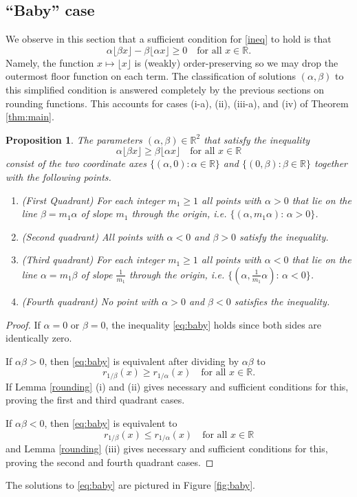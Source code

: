 \documentclass[12pt,letterpaper, reqno]{amsart}
\newtheorem{prop}[thm]{Proposition}
\theoremstyle{definition}
\theoremstyle{remark}
\newcommand{\RR}{\ensuremath{\mathbb{R}}}
\newcommand{\floor}[1]{\lfloor{#1}\rfloor}
\begin{document}
\subsection{``Baby'' case}\label{sec:baby}
We observe in this section that a sufficient condition for \eqref{ineq} to hold is that
\begin{equation}\label{eq:baby}
{\alpha \floor{\beta x}} -  {\beta \floor{\alpha  x}} \ge 0 \quad \text{for all }  x \in \RR .
\end{equation}
Namely,  the function $x\mapsto\floor x$ is (weakly) order-preserving so we may drop the outermost floor function on each term. The classification of solutions $(\alpha,\beta)$ to this simplified condition is answered completely by the previous sections on rounding functions. This accounts for cases (i-a), (ii), (iii-a), and (iv) of Theorem \ref{thm:main}.

\begin{prop}
The parameters  $(\alpha, \beta) \in \RR^2$  that satisfy the inequality
$$ \alpha \floor{ \beta x}  \geq  \beta \floor{ \alpha x} 
\quad \mbox{for all } x \in \RR
$$
consist of the two coordinate axes $\{(\alpha, 0): \alpha  \in \RR \}$
and $\{ (0, \beta):  \beta \in \RR\}$ together with  the following points. 
\begin{enumerate}
\item[(i)] 
{\rm (First Quadrant)}  For each integer $m_1 \ge 1$ all points with $\alpha >0$ that lie on the line $\beta= m_1 \alpha$ of slope $m_1$ through the origin,
i.e. $\{ (\alpha, m_1 \alpha): \, \alpha >0\}$.
\item[(ii)] {\rm (Second quadrant)} All points with $\alpha <0$ and $\beta >0$ satisfy the inequality.
\item[(iii)] {\rm (Third quadrant)}  For each integer $ m_1 \ge 1$ all points with $\alpha <0$ that lie on the line $\alpha=m_1\beta$
of slope $\frac{1}{m_1}$ through the origin,
i.e. $\{ (\alpha,  \frac{1}{m_1} \alpha): \, \alpha <0\}$.
\item[(iv)] {\rm (Fourth quadrant)} No point with $\alpha >0$ and $\beta <0$ satisfies the inequality.

\end{enumerate}
\end{prop}

\begin{proof}
If $\alpha = 0$ or $\beta = 0$, the inequality \eqref{eq:baby} holds since both sides are identically zero.

If $\alpha\beta>0$, then \eqref{eq:baby} is equivalent after dividing by $\alpha\beta$ to
\[ r_{1/\beta}(x) \geq r_{1/\alpha}(x) \quad \text{for all }x\in\RR.\]
If Lemma \ref{rounding} (i) and (ii) gives necessary and sufficient conditions for this, proving the first and third quadrant cases.

If $\alpha\beta< 0$, then \eqref{eq:baby} is equivalent to
\[ r_{1/\beta}(x) \leq r_{1/\alpha}(x) \quad \text{for all } x \in\RR\]
and Lemma \ref{rounding} (iii) gives necessary and sufficient conditions for this, proving the second and fourth quadrant cases.
\end{proof}
The solutions to \eqref{eq:baby} are pictured in Figure \ref{fig:baby}.
\end{document}
